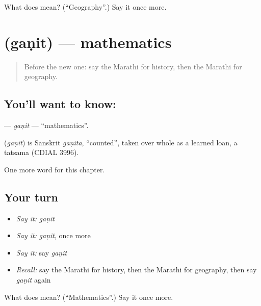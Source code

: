 \begin{tcolorbox}[breakable,colback=teal!4,colframe=teal!35!black,title={Before you move on}]
What does  mean? (\textquotedblleft{}Geography\textquotedblright{}.) Say it once more.
\end{tcolorbox}
\section[\texorpdfstring{\mr{गणित} (gaṇit)}{गणित (gaṇit)}]{ (gaṇit) — mathematics}

\label{lesson:MR-C250-ganit}



\begin{quote}
Before the new one: say the Marathi for history, then the Marathi for geography.
\end{quote}

\subsection*{You'll want to know: }
\textbf{} — \emph{gaṇit} — \textquotedblleft{}mathematics\textquotedblright{}.

\begin{cousinweb}
\textbf{} (\emph{gaṇit}) is Sanskrit \emph{gaṇita}, \textquotedblleft{}counted\textquotedblright{}, taken over whole as a learned loan, a tatsama (CDIAL 3996).
\end{cousinweb}

\begin{grammarlens}[title={What you've built}]
One more word for this chapter.
\end{grammarlens}

\subsection*{Your turn}
\begin{itemize}
\raggedright
  \item \emph{Say it:} \emph{gaṇit}
  \item \emph{Say it:} \emph{gaṇit}, once more
  \item \emph{Say it:} say \emph{gaṇit}
  \item \emph{Recall:} say the Marathi for history, then the Marathi for geography, then say \emph{gaṇit} again
\end{itemize}

\begin{tcolorbox}[breakable,colback=teal!4,colframe=teal!35!black,title={Before you move on}]
What does  mean? (\textquotedblleft{}Mathematics\textquotedblright{}.) Say it once more.
\end{tcolorbox}
